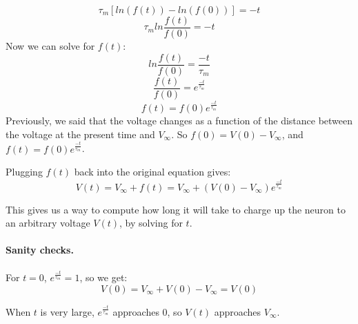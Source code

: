 \documentclass[12pt]{article}
\begin{document}
\[
\tau_m [ln(f(t)) - ln(f(0))] = -t
\]
\[
\tau_m ln\frac{f(t)}{f(0)} = -t
\]
Now we can solve for $f(t)$:
\[
ln\frac{f(t)}{f(0)} = \frac{-t}{\tau_m}
\]
\[
\frac{f(t)}{f(0)} = e^\frac{-t}{\tau_m}
\]
\[
f(t) = f(0)e^\frac{-t}{\tau_m}
\]
Previously, we said that the voltage changes as a function of the
distance between the voltage at the present time and $V_\infty$.  So
$f(0) = V(0) - V_\infty$, and $f(t) = f(0)e^{\frac{-t}{\tau_m}}$.

Plugging $f(t)$ back into the original equation gives:
\[
V(t) = V_\infty + f(t) = V_\infty + (V(0) - V_\infty) e^\frac{-t}{\tau_m}
\]

This gives us a way to compute how long it will take to charge up the neuron to an arbitrary voltage $V(t)$, by solving for $t$.

\paragraph{Sanity checks.}  For $t = 0$, $e^\frac{-t}{\tau_m} = 1$, so we get:
\[
V(0) = V_\infty + V(0) - V_\infty = V(0)
\]

When $t$ is very large, $e^\frac{-t}{\tau_m}$ approaches 0, so $V(t)$ approaches $V_\infty$.
\end{document}
